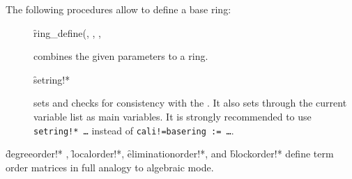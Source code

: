The following procedures allow to define a base ring:
\begin{description}
\item[]
  \hypertarget{procedure:RING_DEFINE}{}
  \begin{syntax}
    \f{ring\_define}(, , , 
  \end{syntax}
combines the given parameters to a ring.

\item[]
  \hypertarget{procedure:SETRING!*}{}
  \begin{syntax}
    \f{setring!*} 
  \end{syntax}
sets  and checks for consistency with the
. It also sets through
 the current variable list as main variables. It is
strongly recommended to use \texttt{setring!* \ldots} instead of
\texttt{cali!=basering := \ldots}.
\end{description}
\f{degreeorder!*} , \f{localorder!*}, \f{eliminationorder!*}, and
\f{blockorder!*}
define term order matrices in full analogy to algebraic mode.
\medskip


